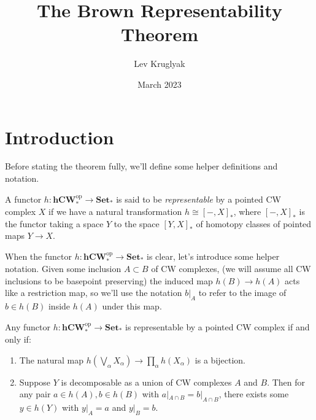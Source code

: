\documentclass[11pt,letterpaper]{article}
\title{The Brown Representability Theorem}
\author{Lev Kruglyak}
\date{March 2023}
\providecommand{\hcwop}{\mathbf{hCW}^{\textrm{op}}_*}
\providecommand{\Set}{\mathbf{Set}_*}
\begin{document}
\maketitle
{}

\section{Introduction}

Before stating the theorem fully, we'll define some helper definitions and notation.

\begin{definition}
    A functor $h : \hcwop \to \Set$ is said to be \emph{representable} by a pointed CW complex $X$ if we have a natural transformation $h\cong [-, X]_*$, where $[-, X]_*$ is the functor taking a space $Y$ to the space $[Y, X]_*$ of homotopy classes of pointed maps $Y \to X$.
\end{definition}

When the functor $h : \hcwop \to \Set$ is clear, let's introduce some helper notation. Given some inclusion $A \subset B$ of CW complexes, (we will assume all CW inclusions to be basepoint preserving) the induced map $h(B) \to h(A)$ acts like a restriction map, so we'll use the notation $b|_A$ to refer to the image of $b\in h(B)$ inside $h(A)$ under this map.

\begin{theorem}[Brown]
    Any functor $h : \hcwop \to \Set$ is representable by a pointed CW complex if and only if:
    \begin{enumerate}
        \item The natural map $h\left(\bigvee_\alpha X_\alpha\right) \to \prod_\alpha h(X_\alpha)$ is a bijection. 
        \item Suppose $Y$ is decomposable as a union of CW complexes $A$ and $B$. Then for any pair $a\in h(A), b\in h(B)$ with $a|_{A\cap B} = b|_{A\cap B}$, there exists some $y\in h(Y)$ with $y|_A = a$ and $y|_B = b$.
    \end{enumerate}
\end{theorem}
\end{document}
